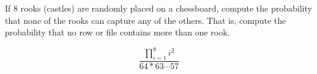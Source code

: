 \item If 8 rooks (castles) are randomly placed on a chessboard, compute the probability that none of the rooks can capture any of the others. That is, compute the probability that no row or file contains more than one rook.

\[ \dfrac{\prod_{i=1}^8 i^2}{64*63 \cdots 57} \]